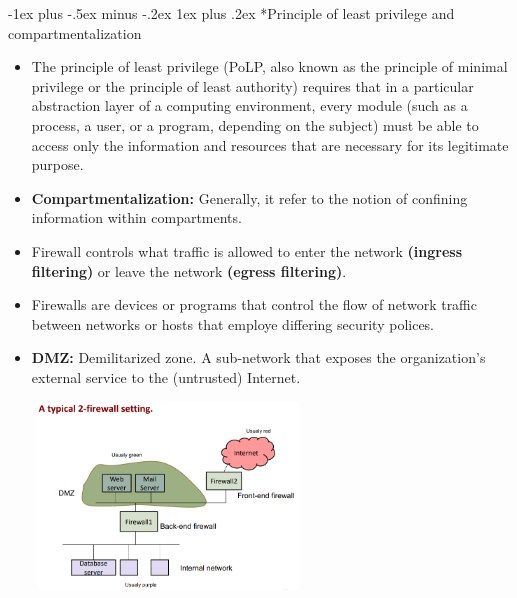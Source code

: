 \documentclass[10pt,landscape]{article}
\makeatletter
\renewcommand{\subsubsection}{\@startsection{subsubsection}{3}{0mm}%
                                {-1ex plus -.5ex minus -.2ex}%
                                {1ex plus .2ex}%
                                {\normalfont\small\bfseries}}
\makeatother
\begin{document}
\begin{multicols*}{3}
\subsubsection*{Principle of least privilege and compartmentalization}
\begin{itemize}[noitemsep,wide=0pt, leftmargin=\dimexpr{} + 2\relax]
    \item The principle of least privilege (PoLP, also known as the principle of
    minimal privilege or the principle of least authority) requires that in a
    particular abstraction layer of a computing environment, every module
    (such as a process, a user, or a program, depending on the subject) must be
    able to access only the information and resources that are necessary for its
    legitimate purpose.
    \item \textbf{Compartmentalization:} Generally, it refer to the notion of confining
    information within compartments. 
\end{itemize}

\begin{itemize}[noitemsep,wide=0pt, leftmargin=\dimexpr{} + 2\relax]
    \item Firewall controls what traffic is allowed to enter the network \textbf{(ingress filtering)} or leave the network \textbf{(egress filtering)}.
    \item Firewalls are devices or programs that control the flow of network traffic between networks or hosts that employe differing security polices.
    \item \textbf{DMZ:} Demilitarized zone. A sub-network that exposes the organization’s external service to the (untrusted) Internet.
\end{itemize}

\includegraphics[width=8.5cm, height=5cm]{images/2-firewall.png}


\end{multicols*}
\end{document}
